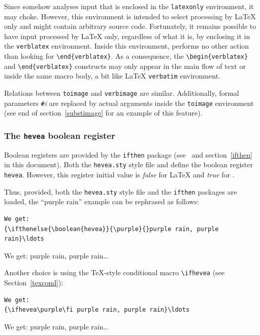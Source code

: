 Since \hevea{} somehow analyses input that is enclosed in the
\texttt{latexonly} environment,
it may choke.
However, this environment is intended to select processing by
\LaTeX{} only and might contain arbitrary source code.
Fortunately, it remains possible to have input processed by \LaTeX{}
only, regardless of what it is, by enclosing it in the
\texttt{verblatex} environment.
Inside this environment, \hevea{} performs no other action
than looking for \verb+\end{verblatex}+. As a consequence,
the \verb+\begin{verblatex}+ and \verb+\end{verblatex}+ constructs
may only appear in the main flow of text or inside the same macro body,
a bit like \LaTeX{} \texttt{verbatim} environment.


Relations between \texttt{toimage} and \texttt{verbimage} are similar.
Additionally, formal parameters \verb+#+\textit{i} are replaced by
actual arguments inside the \texttt{toimage} environment
(see end of section~\ref{substimage} for an example of this feature).

\subsubsection{The \texttt{hevea} boolean register}\label{heveabool}

Boolean registers are provided by the \texttt{ifthen} package
(see~\cite[Section~C.8.5]{latex} and section~\ref{ifthen} in this
document).
Both the \texttt{hevea.sty} style file
and \hevea{} define the boolean register \texttt{hevea}.
However, this register initial value is \textit{false} for \LaTeX{}
and \textit{true} for \hevea{}.



Thus, provided, both the \texttt{hevea.sty} style file and the
\texttt{ifthen} packages are loaded, the ``purple rain'' example can
be rephrased as follows:
\begin{verbatim}
We get:
{\ifthenelse{\boolean{hevea}}{\purple}{}purple rain, purple rain}\ldots
\end{verbatim}
We get:
{purple rain, purple rain}\ldots

\medskip


Another choice is using the \TeX{}-style conditional macro
\verb+\ifhevea+ (see Section~\ref{texcond}):
\begin{verbatim}
We get:
{\ifhevea\purple\fi purple rain, purple rain}\ldots
\end{verbatim}
We get: {\ifhevea\purple\fi purple rain, purple rain}\ldots

